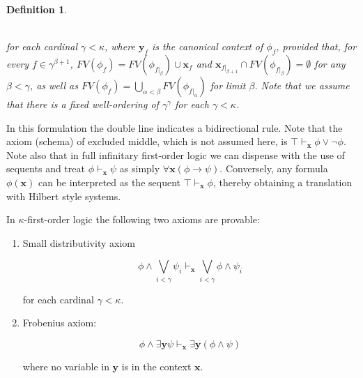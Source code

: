 \documentclass[a4paper,11pt]{article}
\theoremstyle{plain}
\theoremstyle{plain}
\newtheorem{defs}[thm]{Definition}
\theoremstyle{remark}
\begin{document}
\begin{defs}
\begin{enumerate}
\begin{mathpar}
\end{mathpar}
\\
for each cardinal $\gamma < \kappa$, where $\mathbf{y}_{f}$ is the canonical context of $\phi_{f}$, provided that, for every $f \in \gamma^{\beta+1}$,  $FV(\phi_{f}) = FV(\phi_{f|_{\beta}}) \cup \mathbf{x}_{f}$ and $\mathbf{x}_{f|_{\beta +1}} \cap FV(\phi_{f|_{\beta}})= \emptyset$ for any $\beta<\gamma$, as well as $FV(\phi_{f}) = \bigcup_{\alpha<\beta} FV(\phi_{f|_{\alpha}})$ for limit $\beta$. Note that we assume that there is a fixed well-ordering of $\gamma^{\gamma}$ for each $\gamma<\kappa$.

\end{enumerate}
\end{defs}

In this formulation the double line indicates a bidirectional rule. Note that the axiom (schema) of excluded middle, which is not assumed here, is $\top \vdash_{\mathbf{x}} \phi \vee \neg \phi$. Note also that in full infinitary first-order logic we can dispense with the use of sequents and treat $\phi \vdash_{\mathbf{x}} \psi$ as simply $\forall \mathbf{x}(\phi \to \psi)$. Conversely, any formula $\phi(\mathbf{x})$ can be interpreted as the sequent $\top \vdash_{\mathbf{x}} \phi$, thereby obtaining a translation with Hilbert style systems.


In $\kappa$-first-order logic the following two axioms are provable:

\begin{enumerate}
\item Small distributivity axiom

$$\phi \wedge \bigvee_{i<\gamma} \psi_{i} \vdash_{\mathbf{x}} \bigvee_{i<\gamma}\phi \wedge \psi_{i}$$

for each cardinal $\gamma<\kappa$.

\item Frobenius axiom:

$$\phi \wedge \exists \mathbf{y} \psi \vdash_{\mathbf{x}} \exists \mathbf{y} (\phi \wedge \psi)$$

\noindent where no variable in $\mathbf{y}$ is in the context $\mathbf{x}$.
\end{enumerate}
\end{document}

